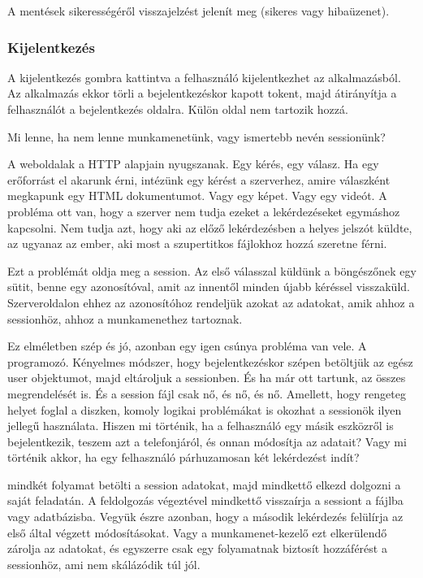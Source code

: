 A mentések sikerességéről visszajelzést jelenít meg (sikeres vagy hibaüzenet).

\subsubsection{Kijelentkezés}
A kijelentkezés gombra kattintva a felhasználó kijelentkezhet az alkalmazásból. Az alkalmazás ekkor törli a bejelentkezéskor kapott tokent, majd átirányítja a felhasználót a bejelentkezés oldalra. Külön oldal nem tartozik hozzá.







Mi lenne, ha nem lenne munkamenetünk, vagy ismertebb nevén sessionünk?

A weboldalak a HTTP alapjain nyugszanak. Egy kérés, egy válasz. Ha egy erőforrást el akarunk érni, intézünk egy kérést a szerverhez, amire válaszként megkapunk egy HTML dokumentumot. Vagy egy képet. Vagy egy videót. 
A probléma ott van, hogy a szerver nem tudja ezeket a lekérdezéseket egymáshoz kapcsolni. Nem tudja azt, hogy aki az előző lekérdezésben a helyes jelszót küldte, az ugyanaz az ember, aki most a szupertitkos fájlokhoz hozzá szeretne férni.

Ezt a problémát oldja meg a session. Az első válasszal küldünk a böngészőnek egy sütit, benne egy azonosítóval, amit az innentől minden újabb kéréssel visszaküld. Szerveroldalon ehhez az azonosítóhoz rendeljük azokat az adatokat, amik ahhoz a sessionhöz, ahhoz a munkamenethez tartoznak.

Ez elméletben szép és jó, azonban egy igen csúnya probléma van vele. A programozó.
Kényelmes módszer, hogy bejelentkezéskor szépen betöltjük az egész user objektumot, majd eltároljuk a sessionben. És ha már ott tartunk, az összes megrendelését is. És a session fájl csak nő, és nő, és nő.
Amellett, hogy rengeteg helyet foglal a diszken, komoly logikai problémákat is okozhat a sessionök ilyen jellegű használata. Hiszen mi történik, ha a felhasználó egy másik eszközről is bejelentkezik, teszem azt a telefonjáról, és onnan módosítja az adatait? Vagy mi történik akkor, ha egy felhasználó párhuzamosan két lekérdezést indít?

mindkét folyamat betölti a session adatokat, majd mindkettő elkezd dolgozni a saját feladatán. A feldolgozás végeztével mindkettő visszaírja a sessiont a fájlba vagy adatbázisba. Vegyük észre azonban, hogy a második lekérdezés felülírja az első által végzett módosításokat. Vagy a munkamenet-kezelő ezt elkerülendő zárolja az adatokat, és egyszerre csak egy folyamatnak biztosít hozzáférést a sessionhöz, ami nem skálázódik túl jól.


